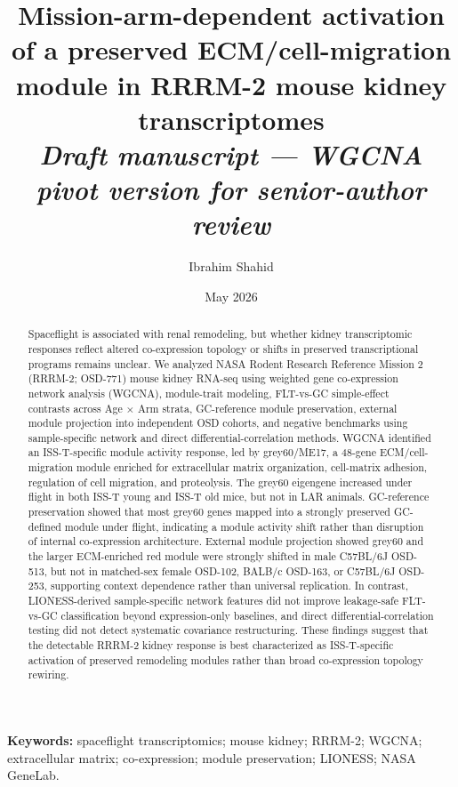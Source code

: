 \documentclass[11pt]{article}
\title{\textbf{Mission-arm-dependent activation of a preserved ECM/cell-migration module in RRRM-2 mouse kidney transcriptomes} \\[0.4em]
\large \textit{Draft manuscript --- WGCNA pivot version for senior-author review}}
\author[1]{Ibrahim Shahid}
\author[1,*]{}
\affil[1]{Independent research; manuscript in preparation}
\affil[*]{Senior author placeholder pending PI involvement}
\date{May 2026}
\begin{document}
\maketitle

\begin{abstract}
\noindent
Spaceflight is associated with renal remodeling, but whether kidney transcriptomic responses reflect altered co-expression topology or shifts in preserved transcriptional programs remains unclear. We analyzed NASA Rodent Research Reference Mission 2 (RRRM-2; OSD-771) mouse kidney RNA-seq using weighted gene co-expression network analysis (WGCNA), module-trait modeling, FLT-vs-GC simple-effect contrasts across Age $\times$ Arm strata, GC-reference module preservation, external module projection into independent OSD cohorts, and negative benchmarks using sample-specific network and direct differential-correlation methods. WGCNA identified an ISS-T-specific module activity response, led by grey60/ME17, a 48-gene ECM/cell-migration module enriched for extracellular matrix organization, cell-matrix adhesion, regulation of cell migration, and proteolysis. The grey60 eigengene increased under flight in both ISS-T young and ISS-T old mice, but not in LAR animals. GC-reference preservation showed that most grey60 genes mapped into a strongly preserved GC-defined module under flight, indicating a module activity shift rather than disruption of internal co-expression architecture. External module projection showed grey60 and the larger ECM-enriched red module were strongly shifted in male C57BL/6J OSD-513, but not in matched-sex female OSD-102, BALB/c OSD-163, or C57BL/6J OSD-253, supporting context dependence rather than universal replication. In contrast, LIONESS-derived sample-specific network features did not improve leakage-safe FLT-vs-GC classification beyond expression-only baselines, and direct differential-correlation testing did not detect systematic covariance restructuring. These findings suggest that the detectable RRRM-2 kidney response is best characterized as ISS-T-specific activation of preserved remodeling modules rather than broad co-expression topology rewiring.
\end{abstract}

\vspace{0.3em}
\noindent\textbf{Keywords:} spaceflight transcriptomics; mouse kidney; RRRM-2; WGCNA; extracellular matrix; co-expression; module preservation; LIONESS; NASA GeneLab.
\end{document}
